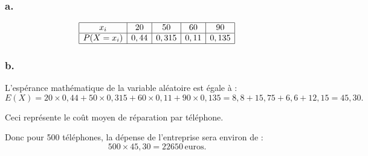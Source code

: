 	\subsubsection*{a.}
	

	\[
	\begin{array}{|c|c|c|c|c|}
		\hline	x_i & 20 & 50 & 60 & 90 \\
		\hline
		P(X = x_i) & 0,44 & 0,315 & 0,11 & 0,135 \\
			\hline
	\end{array}
	\]
	
	\subsubsection*{b.}
	
	L'espérance mathématique de la variable aléatoire est égale à :
	\[
	E(X) = 20 \times 0,44 + 50 \times 0,315 + 60 \times 0,11 + 90 \times 0,135 = 8,8 + 15,75 + 6,6 + 12,15 = 45,30.
	\]
	
	Ceci représente le coût moyen de réparation par téléphone.
	
	Donc pour 500 téléphones, la dépense de l'entreprise sera environ de :
	\[
	500 \times 45,30 = 22 650 \, \text{euros}.
	\]
